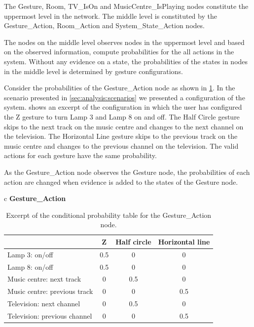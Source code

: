 The Gesture, Room, TV\_IsOn and MusicCentre\_IsPlaying nodes constitute the uppermost level in the network. The middle level is constituted by the Gesture\_Action, Room\_Action and System\_State\_Action nodes.

The nodes on the middle level observes nodes in the uppermost level and based on the observed information, compute probabilities for the all actions in the system. Without any evidence on a state, the probabilities of the states in nodes in the middle level is determined by gesture configurations.

Consider the probabilities of the Gesture\_Action node as shown in \cref{tbl:design:bayesian-network:cpt-gesture-action}. In the scenario presented in \cref{sec:analysis:scenarios} we presented a configuration of the system.  shows an excerpt of the configuration in which the user has configured the Z gesture to turn Lamp 3 and Lamp 8 on and off. The Half Circle gesture skips to the next track on the music centre and changes to the next channel on the television. The Horizontal Line gesture skips to the previous track on the music centre and changes to the previous channel on the television. The valid actions for each gesture have the same probability.

As the Gesture\_Action node observes the Gesture node, the probabilities of each action are changed when evidence is added to the states of the Gesture node.

\begin{table}[h!]
\centering
\caption{Excerpt of the conditional probability table for the Gesture\_Action node.}
\label{tbl:design:bayesian-network:cpt-gesture-action}
\begin{tabular}{c}
\textbf{Gesture\_Action}   \\
\begin{tabular}{l|ccc}
                             & Z   & Half circle & Horizontal line \\ \hline
Lamp 3: on/off               & 0.5 & 0             & 0                \\
Lamp 8: on/off               & 0.5 & 0             & 0                \\
Music centre: next track     & 0   & 0.5             & 0                \\
Music centre: previous track & 0   & 0             & 0.5              \\
Television: next channel     & 0   & 0.5             & 0                \\
Television: previous channel & 0   & 0             & 0.5              
\end{tabular}
\end{tabular}
\end{table}

